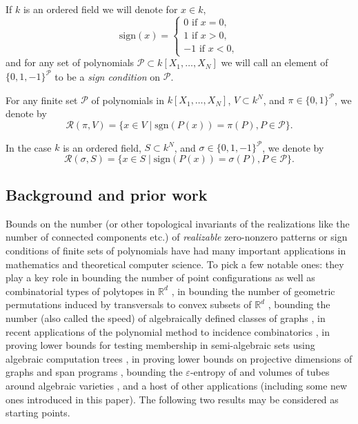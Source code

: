 \documentclass[10pt]{amsart}
\theoremstyle{definition}
\theoremstyle{remark}
\numberwithin{equation}{section}
\newcommand {\sign} {\mathrm{sign}}
\newcommand {\RR} {{\mathcal R}}
\newcommand {\eps} {{\varepsilon}}
\newcommand{\sgn}{\mathrm{sgn}}
\begin{document}
If $k$ is an ordered field we will denote for $x \in k$, 
\[
\sign(x) = \begin{cases}
                0 \text{ if } x=0, \\
                1 \text{ if } x>0, \\
                -1 \text{ if } x < 0,
        \end{cases}
\]
and for any set of polynomials $\mathcal{P} \subset k[X_1,\ldots,X_N]$
we will call an element of $\{0,1,-1\}^{\mathcal{P}}$ to be a 
\emph{sign condition} on $\mathcal{P}$.

For any finite set $\mathcal{P}$ of polynomials in $k[X_1,\ldots,X_N]$, $V\subset k^N$, and
$\pi\in \{0,1\}^{\mathcal{P}}$, we denote by 
\[
\RR(\pi,V) = \{x \in V \mid \sgn
(P(x)) = \pi(P), P \in \mathcal{P}\}.
\]


In the case $k$ is an ordered field,
$S \subset k^N$, and
$\sigma \in \{0,1,-1\}^{\mathcal{P}}$, we denote by 
\[
\RR(\sigma,S) = \{x \in S  \mid \sign(P(x)) = \sigma(P), P \in \mathcal{P}\}.
\]

\subsection{Background and prior work}
Bounds on the number (or other topological invariants of the realizations like the number of connected components etc.) 
of \emph{realizable} zero-nonzero patterns or sign conditions of finite sets of polynomials have had many important applications in mathematics and theoretical computer science. 
To pick a few notable ones: 
they play a key role in bounding the number of point configurations  as well as combinatorial types of polytopes  in $\mathbb{R}^d$ \cite{GP1986}, in bounding the number of geometric permutations induced by transversals to convex subsets of $\mathbb{R}^d$ \cite{GPW1996}, bounding the number (also called the speed) of algebraically defined classes of graphs \cite{Alon-Pach-et-al,Sauermann}, in recent applications of the polynomial method
to incidence combinatorics \cite{Basu-Sombra, Walsh1, Walsh2, Tao-survey, Sheffer-book, Guth-book},
in proving lower bounds for testing  membership in semi-algebraic sets using algebraic computation trees \cite{Ben-Or,Yao,GV2017},
in proving lower bounds on projective dimensions of graphs and span programs
\cite{RBG01},
bounding the $\eps$-entropy of and volumes of tubes around algebraic varieties
\cite{Basu-Lerario2023,Zhang-Kileel2023},
and a host of other applications (including some new ones introduced in this paper).
The following two results may be considered as starting points.
\end{document}
